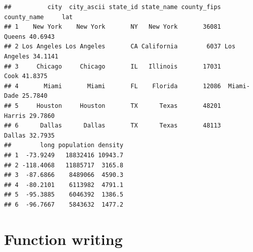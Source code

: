 \documentclass[
]{article}
\begin{document}
\begin{verbatim}
##          city  city_ascii state_id state_name county_fips county_name     lat
## 1    New York    New York       NY   New York       36081      Queens 40.6943
## 2 Los Angeles Los Angeles       CA California        6037 Los Angeles 34.1141
## 3     Chicago     Chicago       IL   Illinois       17031        Cook 41.8375
## 4       Miami       Miami       FL    Florida       12086  Miami-Dade 25.7840
## 5     Houston     Houston       TX      Texas       48201      Harris 29.7860
## 6      Dallas      Dallas       TX      Texas       48113      Dallas 32.7935
##        long population density
## 1  -73.9249   18832416 10943.7
## 2 -118.4068   11885717  3165.8
## 3  -87.6866    8489066  4590.3
## 4  -80.2101    6113982  4791.1
## 5  -95.3885    6046392  1386.5
## 6  -96.7667    5843632  1477.2
\end{verbatim}

\section{Function writing}\label{function-writing}
\end{document}
